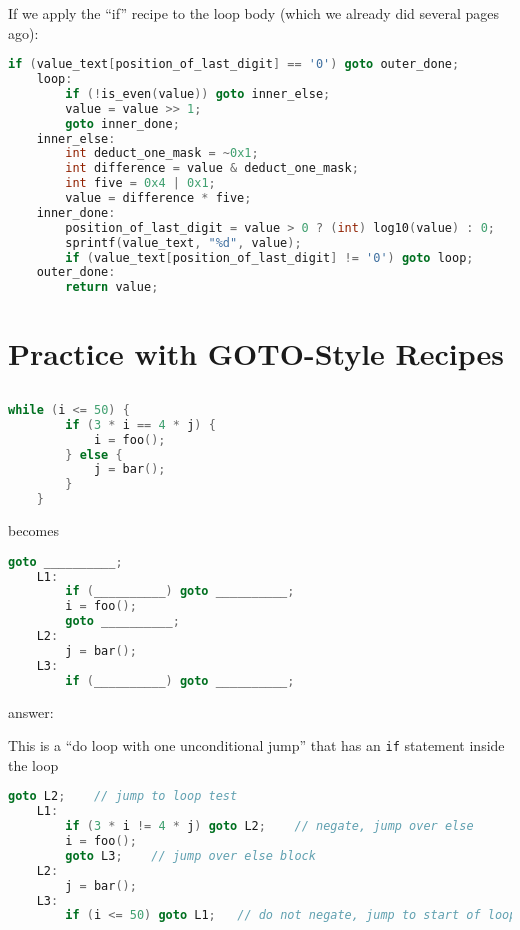 \documentclass{article}
\begin{document}
If we apply the ``if'' recipe to the loop body (which we already did several pages ago):

\begin{lstlisting}[language=C]
        if (value_text[position_of_last_digit] == '0') goto outer_done;
    loop:
        if (!is_even(value)) goto inner_else;
        value = value >> 1;
        goto inner_done;
    inner_else:
        int deduct_one_mask = ~0x1;
        int difference = value & deduct_one_mask;
        int five = 0x4 | 0x1;
        value = difference * five;
    inner_done:
        position_of_last_digit = value > 0 ? (int) log10(value) : 0;
        sprintf(value_text, "%d", value);
        if (value_text[position_of_last_digit] != '0') goto loop;
    outer_done:
        return value;
\end{lstlisting}

\newpage
\section{Practice with GOTO-Style Recipes}

\subsection{}

\begin{lstlisting}[language=C]
    while (i <= 50) {
        if (3 * i == 4 * j) {
            i = foo();
        } else {
            j = bar();
        }
    }
\end{lstlisting}

becomes

\begin{lstlisting}[language=C]
        goto __________;
    L1:
        if (__________) goto __________;
        i = foo();
        goto __________;
    L2:
        j = bar();
    L3:
        if (__________) goto __________;
\end{lstlisting}

answer:

This is a ``do loop with one unconditional jump'' that has an \lstinline{if} statement inside the loop
\begin{lstlisting}[language=C]
        goto L2;    // jump to loop test
    L1:
        if (3 * i != 4 * j) goto L2;    // negate, jump over else
        i = foo();
        goto L3;    // jump over else block
    L2:
        j = bar();
    L3:
        if (i <= 50) goto L1;   // do not negate, jump to start of loop
\end{lstlisting}
\end{document}
